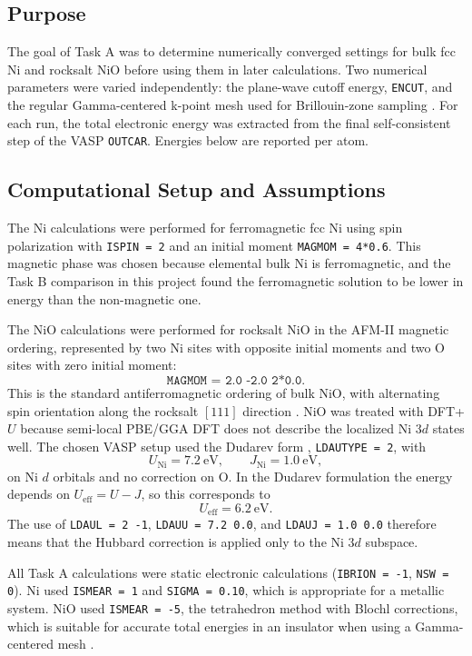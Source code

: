 \subsection{Purpose}

The goal of Task A was to determine numerically converged settings for bulk
fcc Ni and rocksalt NiO before using them in later calculations.  Two numerical
parameters were varied independently: the plane-wave cutoff energy, \texttt{ENCUT},
and the regular Gamma-centered k-point mesh used for Brillouin-zone sampling
\cite{vasp-encut,vasp-kpoints,monkhorst-pack}.
For each run, the total electronic energy was extracted from the final
self-consistent step of the VASP \texttt{OUTCAR}.  Energies below are reported
per atom.

\subsection{Computational Setup and Assumptions}

The Ni calculations were performed for ferromagnetic fcc Ni using spin
polarization with \texttt{ISPIN = 2} and an initial moment
\texttt{MAGMOM = 4*0.6}.  This magnetic phase was chosen because elemental bulk
Ni is ferromagnetic, and the Task B comparison in this project found the
ferromagnetic solution to be lower in energy than the non-magnetic one.

The NiO calculations were performed for rocksalt NiO in the AFM-II magnetic
ordering, represented by two Ni sites with opposite initial moments and two O
sites with zero initial moment:
\[
  \texttt{MAGMOM = 2.0 -2.0 2*0.0}.
\]
This is the standard antiferromagnetic ordering of bulk NiO, with alternating
spin orientation along the rocksalt \([111]\) direction
\cite{vasp-nio-magnetism}.  NiO was treated with DFT+\(U\) because semi-local
PBE/GGA DFT \cite{pbe} does not describe the localized Ni \(3d\) states well.
The chosen VASP setup used the Dudarev form \cite{dudarev,vasp-ldautype},
\texttt{LDAUTYPE = 2}, with
\[
  U_{\mathrm{Ni}} = 7.2~\mathrm{eV}, \qquad
  J_{\mathrm{Ni}} = 1.0~\mathrm{eV},
\]
on Ni \(d\) orbitals and no correction on O.  In the Dudarev formulation the
energy depends on \(U_{\mathrm{eff}} = U - J\), so this corresponds to
\[
  U_{\mathrm{eff}} = 6.2~\mathrm{eV}.
\]
The use of \texttt{LDAUL = 2 -1}, \texttt{LDAUU = 7.2 0.0}, and
\texttt{LDAUJ = 1.0 0.0} therefore means that the Hubbard correction is applied
only to the Ni \(3d\) subspace.

All Task A calculations were static electronic calculations
(\texttt{IBRION = -1}, \texttt{NSW = 0}).  Ni used
\texttt{ISMEAR = 1} and \texttt{SIGMA = 0.10}, which is appropriate for a
metallic system.  NiO used \texttt{ISMEAR = -5}, the tetrahedron method with
Blochl corrections, which is suitable for accurate total energies in an
insulator when using a Gamma-centered mesh \cite{vasp-ismear}.

